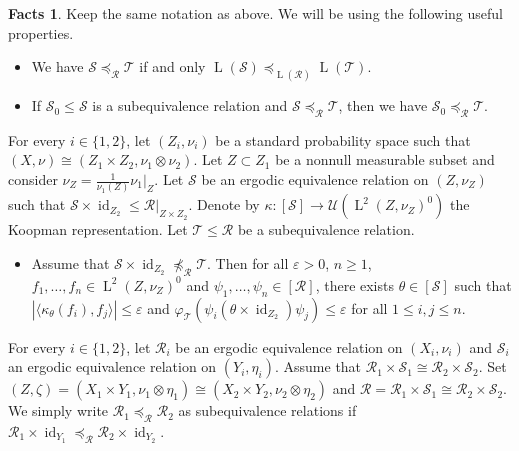\documentclass[11pt]{amsart}
\numberwithin{equation}{section}
\theoremstyle{plain}
\theoremstyle{definition}
\newtheorem{facts}[thm]{Facts}
\newcommand{\id}{\operatorname{id}}
\newcommand{\rL}{\operatorname{L}}
\begin{document}
\begin{facts}\label{fact-equivalence}
Keep the same notation as above. We will be using the following useful properties. 
\begin{itemize}
\item [$(\rm i)$] We have $\mathscr S \preceq_{\mathscr R} \mathscr T$ if and only $\rL(\mathscr S) \preceq_{\rL(\mathscr R)} \rL(\mathscr T)$. 

\item [$(\rm ii)$] If $\mathscr S_0 \leq \mathscr S$ is a subequivalence relation and $\mathscr S \preceq_{\mathscr R} \mathscr T$, then we have $\mathscr S_0 \preceq_{\mathscr R} \mathscr T$.
\end{itemize}

For every $i \in \{1, 2\}$, let $(Z_i,\nu_i)$ be a standard probability space such that $(X,\nu)\cong (Z_1\times Z_2, \nu_1\otimes\nu_2)$. Let $Z \subset Z_1$ be a nonnull measurable subset and consider $\nu_Z = \frac{1}{\nu_1(Z)}\nu_1|_Z$. Let $\mathscr S$ be an ergodic equivalence relation on $(Z, \nu_Z)$ such that $\mathscr S\times \id_{Z_2}\leq \mathscr R|_{Z \times Z_2}$. Denote by $\kappa : [\mathscr S] \to \mathscr U(\rL^2(Z,\nu_Z)^0)$ the Koopman representation. Let $\mathscr T \leq \mathscr R$ be a  subequivalence relation.

\begin{itemize}
\item [$(\rm iii)$] Assume that $\mathscr S \times \id_{Z_2} \npreceq_{\mathscr R}  \mathscr T$. Then for all $\varepsilon>0$, $n \geq 1$, $f_1,\dots, f_n\in \rL^2(Z,\nu_Z)^{0}$ and $\psi_1,\dots,\psi_n\in [\mathscr R]$, there exists $\theta\in [\mathscr S]$ such that $|\langle \kappa_{\theta}(f_i),f_j \rangle|\leq\varepsilon$ and $\varphi_{\mathscr T}(\psi_i (\theta\times \id_{Z_2}) \psi_j)\leq \varepsilon$ for all $1\leq i,j\leq n$. 
\end{itemize}

For every $i \in \{1, 2\}$, let $\mathscr R_i$ be an ergodic equivalence relation on $(X_i, \nu_i)$ and $\mathscr S_i$ an ergodic equivalence relation on $(Y_i, \eta_i)$. Assume that $\mathscr R_1 \times \mathscr S_1 \cong \mathscr R_2 \times \mathscr S_2$. Set $(Z, \zeta) = (X_1 \times Y_1, \nu_1 \otimes \eta_1) \cong (X_2 \times Y_2, \nu_2 \otimes \eta_2)$ and $\mathscr R = \mathscr R_1 \times \mathscr S_1 \cong \mathscr R_2 \times \mathscr S_2$. We simply write $\mathscr R_1 \preceq_{\mathscr R} \mathscr R_2$ as subequivalence relations if $\mathscr R_1 \times \id_{Y_1} \preceq_{\mathscr R} \mathscr R_2 \times \id_{Y_2}$.


\end{facts}
\end{document}
